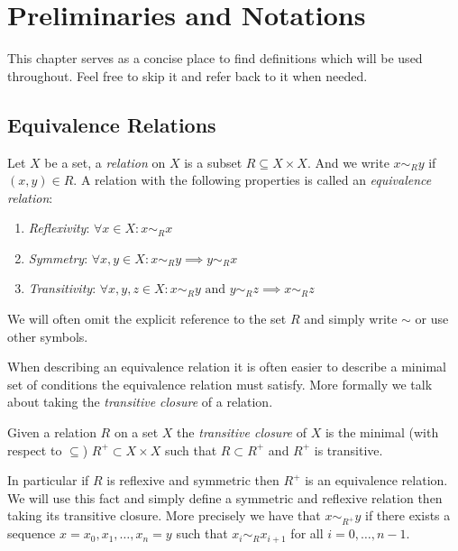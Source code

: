 \chapter{Preliminaries and Notations}
\label{chapter__preliminaries}

This chapter serves as a concise place to find definitions which will be used throughout. Feel free to skip it and refer back to it when needed.

\section{Equivalence Relations}

\begin{definition}{}{}
    Let $X$ be a set, a \emph{relation} on $X$ is a subset $R \subseteq X \times X$. And we write $x \sim_R y$ if $(x,y) \in R$.
    A relation with the following properties is called an \emph{equivalence relation}:
    \begin{enumerate}
        \item \emph{Reflexivity}: $\forall x \in X: x \sim_R x$
        \item \emph{Symmetry}: $\forall x,y \in X: x \sim_R y \implies y \sim_R x$
        \item \emph{Transitivity}: $\forall x,y,z \in X: x \sim_R y \text{ and } y \sim_R z \implies x \sim_R z$
    \end{enumerate}
    We will often omit the explicit reference to the set $R$ and simply write $\sim$ or use other symbols.
\end{definition}

When describing an equivalence relation it is often easier to describe a minimal set of conditions the equivalence relation must satisfy. More formally we talk about taking the \emph{transitive closure} of a relation.

\begin{definition}{}{}
    Given a relation $R$ on a set $X$ the \emph{transitive closure} of $X$ is the minimal (with respect to $\subseteq$) $R^+ \subset X \times X$ such that $R \subset R^+$ and $R^+$ is transitive.
\end{definition}

In particular if $R$ is reflexive and symmetric then $R^+$ is an equivalence relation.
We will use this fact and simply define a symmetric and reflexive relation then taking its transitive closure. More precisely we have that $x \sim_{R^+} y$ if there exists a sequence $x = x_0, x_1, \dots, x_n = y$ such that $x_i \sim_R x_{i+1}$ for all $i = 0, \dots, n-1$.

